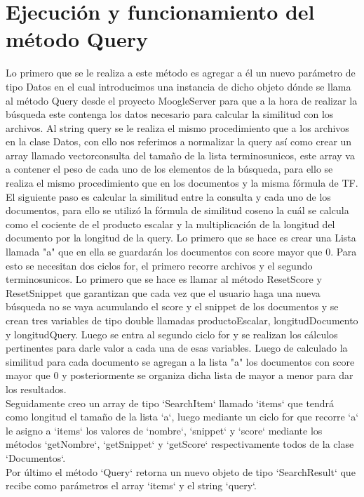 \documentclass{article}
\begin{document}
\section{Ejecución y funcionamiento del método Query}
Lo primero que se le realiza a este método es agregar a él un nuevo parámetro de tipo Datos en el cual introducimos una instancia de dicho
objeto dónde se llama al método Query desde el proyecto MoogleServer para que a la hora de realizar la búsqueda este contenga los 
datos necesario para calcular la similitud con los archivos.
Al string query se le realiza el mismo procedimiento que a los archivos en la clase Datos, con ello nos referimos a normalizar la 
query así como crear un array llamado vectorconsulta del tamaño de la lista terminosunicos, este array va a contener el peso
de cada uno de los elementos de la búsqueda, para ello se realiza el mismo procedimiento que en los documentos y la misma fórmula 
de TF.\\
El siguiente paso es calcular la similitud entre la consulta y cada uno de los documentos, para ello se utilizó la fórmula
de similitud coseno la cuál se calcula como el cociente de el producto escalar y la multiplicación de la longitud
del documento por la longitud de la query. Lo primero que se hace es crear una Lista llamada "a" que en ella se guardarán
los documentos con score mayor que 0. Para esto se necesitan dos ciclos for, el primero recorre archivos y el segundo terminosunicos.
Lo primero que se hace es llamar al método ResetScore y ResetSnippet que garantizan que cada vez que el usuario haga una nueva búsqueda
no se vaya acumulando el score y el snippet de los documentos y se crean tres variables de tipo double llamadas
productoEscalar, longitudDocumento y longitudQuery. Luego se entra al segundo ciclo for y se realizan los cálculos 
pertinentes para darle valor a cada una de esas variables. Luego de calculado la similitud para cada documento se agregan a la lista
"a" los documentos con score mayor que 0 y posteriormente se organiza dicha lista de mayor a menor para dar los resultados.\\
Seguidamente creo un array de tipo `SearchItem` llamado `items` que tendrá como longitud 
el tamaño de la lista `a`, luego mediante un ciclo for que recorre `a` 
le asigno a `items` los valores de `nombre`, `snippet` y `score` mediante los métodos `getNombre`,
`getSnippet` y `getScore` respectivamente todos de la clase `Documentos`.\\
Por último el método `Query` retorna un nuevo objeto de tipo `SearchResult` que recibe como parámetros
el array `items` y el string `query`.\\
\end{document}
